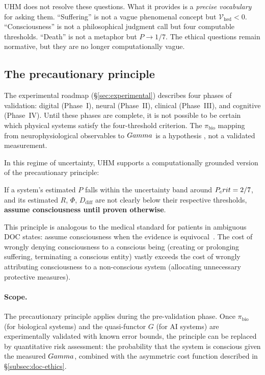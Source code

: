 UHM does not resolve these questions.  What it provides is a \emph{precise vocabulary}
for asking them.  ``Suffering'' is not a vague phenomenal concept but
$\mathcal{V}_{\mathrm{hed}} < 0$.  ``Consciousness'' is not a philosophical judgment
call but four computable thresholds.  ``Death'' is not a metaphor but $P \to 1/7$.
The ethical questions remain normative, but they are no longer computationally vague.

\subsection{The precautionary principle}
\label{subsec:precautionary}

The experimental roadmap (\S\ref{sec:experimental}) describes four phases of
validation: digital (Phase~I), neural (Phase~II), clinical (Phase~III), and
cognitive (Phase~IV). Until these phases are complete, it is not possible to
be certain which physical systems satisfy the four-threshold criterion. The
$\pi_{\mathrm{bio}}$ mapping from neurophysiological observables to $Gamma$
is a hypothesis , not a validated measurement.

In this regime of uncertainty, UHM supports a computationally grounded version of the
precautionary principle:

\begin{predictionbox}
If a system's estimated $P$ falls within the uncertainty band around $P_crit = 2/7$,
and its estimated $R$, $\Phi$, $D_{\mathrm{diff}}$ are not clearly below their respective
thresholds, \textbf{assume consciousness until proven otherwise}.
\end{predictionbox}

This principle is analogous to the medical standard for patients in ambiguous DOC states:
assume consciousness when the evidence is equivocal~\cite{casali2013}.  The cost of
wrongly denying consciousness to a conscious being (creating or prolonging suffering,
terminating a conscious entity) vastly exceeds the cost of wrongly attributing
consciousness to a non-conscious system (allocating unnecessary protective measures).

\paragraph{Scope.}
The precautionary principle applies during the pre-validation phase.  Once
$\pi_{\mathrm{bio}}$ (for biological systems) and the quasi-functor $G$ (for AI systems)
are experimentally validated with known error bounds, the principle can be replaced by
quantitative risk assessment: the probability that the system is conscious given the
measured $Gamma$, combined with the asymmetric cost function described in
\S\ref{subsec:doc-ethics}.

